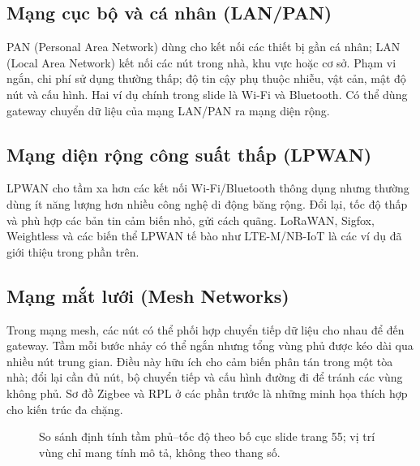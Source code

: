 \subsection{Mạng cục bộ và cá nhân (LAN/PAN)}
PAN (Personal Area Network) dùng cho kết nối các thiết bị gần cá nhân; LAN (Local Area Network) kết nối các nút trong nhà, khu vực hoặc cơ sở. Phạm vi ngắn, chi phí sử dụng thường thấp; độ tin cậy phụ thuộc nhiễu, vật cản, mật độ nút và cấu hình. Hai ví dụ chính trong slide là Wi-Fi và Bluetooth. Có thể dùng gateway chuyển dữ liệu của mạng LAN/PAN ra mạng diện rộng. 

\subsection{Mạng diện rộng công suất thấp (LPWAN)}
LPWAN cho tầm xa hơn các kết nối Wi-Fi/Bluetooth thông dụng nhưng thường dùng ít năng lượng hơn nhiều công nghệ di động băng rộng. Đổi lại, tốc độ thấp và phù hợp các bản tin cảm biến nhỏ, gửi cách quãng. LoRaWAN, Sigfox, Weightless và các biến thể LPWAN tế bào như LTE-M/NB-IoT là các ví dụ đã giới thiệu trong phần trên. 

\subsection{Mạng mắt lưới (Mesh Networks)}
Trong mạng mesh, các nút có thể phối hợp chuyển tiếp dữ liệu cho nhau để đến gateway. Tầm mỗi bước nhảy có thể ngắn nhưng tổng vùng phủ được kéo dài qua nhiều nút trung gian. Điều này hữu ích cho cảm biến phân tán trong một tòa nhà; đổi lại cần đủ nút, bộ chuyển tiếp và cấu hình đường đi để tránh các vùng không phủ. Sơ đồ Zigbee và RPL ở các phần trước là những minh họa thích hợp cho kiến trúc đa chặng. 

\begin{figure}[htbp]\centering
{}
\caption{So sánh định tính tầm phủ--tốc độ theo bố cục slide trang 55; vị trí vùng chỉ mang tính mô tả, không theo thang số.}\end{figure}

